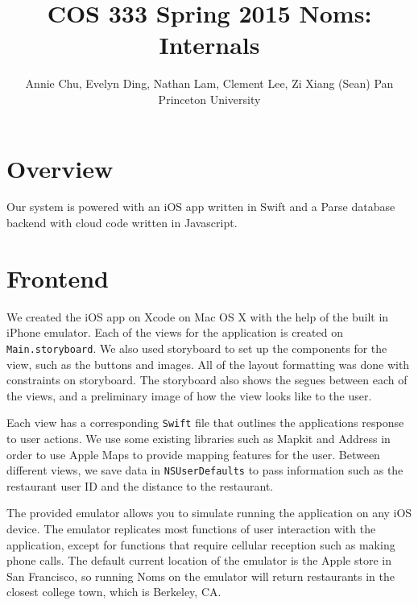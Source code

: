 \documentclass[12pt]{article}
\begin{document}
\title{\textbf{COS 333 Spring 2015 Noms: Internals}}
	
\author{
		Annie Chu, Evelyn Ding, Nathan Lam, Clement Lee, Zi Xiang (Sean) Pan \\
		Princeton University}
	
\maketitle	
\section{Overview}
Our system is powered with an iOS app written in Swift and a Parse database backend with cloud code written in Javascript.  
\section{Frontend}
We created the iOS app on Xcode on Mac OS X with the help of the built in iPhone emulator. Each of the views for the application is created on \texttt{Main.storyboard}.  We also used storyboard to set up the components for the view, such as the buttons and images.  All of the layout formatting was done with constraints on storyboard.  The storyboard also shows the segues between each of the views, and a preliminary image of how the view looks like to the user.

Each view has a corresponding \texttt{Swift} file that outlines the applications response to user actions.  We use some existing libraries such as Mapkit and Address in order to use Apple Maps to provide mapping features for the user.  Between different views, we save data in \texttt{NSUserDefaults} to pass information such as the restaurant user ID and the distance to the restaurant.

The provided emulator allows you to simulate running the application on any iOS device.  The emulator replicates most functions of user interaction with the application, except for functions that require cellular reception such as making phone calls.  The default current location of the emulator is the Apple store in San Francisco, so running Noms on the emulator will return restaurants in the closest college town, which is Berkeley, CA.
\end{document}
